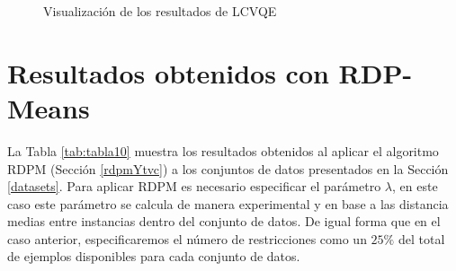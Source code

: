 \begin{figure}[bth]
	\myfloatalign
	\caption{Visualización de los resultados de \acs{LCVQE}}\label{fig:figure26}
\end{figure}

\clearpage

\section{Resultados obtenidos con RDP-Means}

La Tabla \ref{tab:tabla10} muestra los resultados obtenidos al aplicar el algoritmo \acf{RDPM} (Sección \ref{rdpmYtvc}) a los conjuntos de datos presentados en la Sección \ref{datasets}. Para aplicar \acs{RDPM} es necesario especificar el parámetro $\lambda$, en este caso este parámetro se calcula de manera experimental y en base a las distancia medias entre instancias dentro del conjunto de datos. De igual forma que en el caso anterior, especificaremos el número de restricciones como un $25\%$ del total de ejemplos disponibles para cada conjunto de datos.

